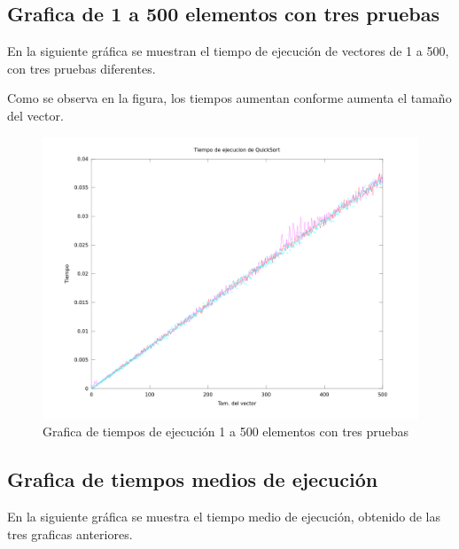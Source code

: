 \documentclass[a4,12pt]{article}
\begin{document}
\subsection{Grafica de 1 a 500 elementos con tres pruebas}
En la siguiente gráfica se muestran el tiempo de ejecución de vectores de 1 a 500, con tres pruebas diferentes.

Como se observa en la figura, los tiempos aumentan conforme aumenta el tamaño del vector. 
\begin{figure}[h]
\includegraphics[width=1\textwidth]{Graficos/Grafica500}
\caption{Grafica de tiempos de ejecución 1 a 500 elementos con tres pruebas}
\label{fig:Grafica500}
\end{figure}
\subsection{Grafica de tiempos medios de ejecución}
En la siguiente gráfica se muestra el tiempo medio de ejecución, obtenido de las tres graficas anteriores.
\end{document}

